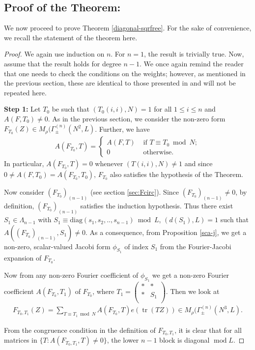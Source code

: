 \documentclass[11pt]{amsart}
\numberwithin{equation}{section}
\newcommand{\mrm}{\mathrm} %
\newcommand{\smat}[4]{\left( \begin{smallmatrix} #1 & #2 \\ #3 & #4 \\ \end{smallmatrix} \right)}
\DeclareMathOperator{\tr}{tr}
\renewcommand*{\mod}{\operatorname{mod}}
\newcommand{\Mrho}[2]{M_\rho(\Gamma_\pm^{(#1)}(#2, L)}
\begin{document}
\subsection{Proof of the Theorem:} We now proceed to prove Theorem \ref{diagonal-sqrfree}. For the sake of convenience, we recall the statement of the theorem here. \diagonalsqrfree*
\begin{proof}
     We again use induction on $n$. For $n=1$, the result is trivially true. Now, assume that the result holds for degree $n-1$. We once again remind the reader that one needs to check the conditions on the weights; however, as mentioned in the previous section, these are identical to those presented in \cite[Section~4.3]{boche-das} and will not be repeated here.

\textbf{Step 1:}    Let $T_0$ be such that $(T_0(i,i), N)=1$ for all $1\le i\le n$ and $A(F, T_0)\neq 0$. As in the previous section, we consider the non-zero form $ F_{T_0}(Z) \in \Mrho{n}{N^2}$. Further, we have
\begin{align}
    A(F_{T_0}, T)=\begin{cases}
        A(F, T)& \text{ if } T\equiv T_0 \bmod N;\\
        0 & \text{ otherwise.}
    \end{cases}
\end{align}
In particular, $A(F_{T_0}, T)=0$ whenever $(T(i,i), N)\neq 1$ and since $0\neq A(F, T_0)=A(F_{T_0}, T_0)$, $F_{T_0}$ also satisfies the hypothesis of the Theorem.

Now consider $(F_{T_0})_{(n-1)}$ (see section \ref{sec:Fcirc}). Since $(F_{T_0})_{(n-1)}\neq 0$, by definition, $(F_{T_0})_{(n-1)}$ satisfies the induction hypothesis. Thus there exist $S_1 \in \Lambda_{n-1}$ with $S_1\equiv \mrm{diag}(s_1, s_2,..,s_{n-1})\bmod L$, $(d(S_1),L)=1$ such that $A((F_{T_0})_{(n-1)}, S_1)\neq 0$.  As a consequence,  from Proposition \ref{sca-j}, we get a non-zero, scalar-valued Jacobi form $\phi_{S_1}$ of index $S_1$ from the Fourier-Jacobi expansion of $F_{T_0}$. 

Now from any non-zero Fourier coefficient of $\phi_{S_1}$ we get a non-zero Fourier coefficient $A(F_{T_0}, T_1)$ of $F_{T_0}$, where $T_1=\smat{*}{*}{*}{S_1}$. Then we look  at
\begin{align}
    F_{T_0,T_1}(Z)= \sum_{T\equiv T_1 \bmod N}A(F_{T_0}, T)e(\tr(TZ))\in \Mrho{n}{N^3}.
\end{align}

From the congruence condition in the definition of $F_{T_0,T_1}$, it is clear that for all matrices in $\{ T: A(F_{T_0, T_1}, T)\neq 0\}$, the lower $n-1$ block is diagonal $\mod L$.


\end{proof}
\end{document}
